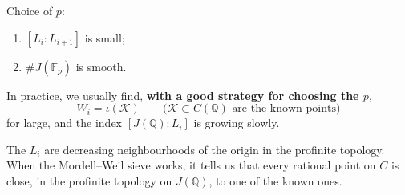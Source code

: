 \documentclass{beamer}
\newcommand{\Q}{{\mathbb Q}}
\newcommand{\F}{{\mathbb F}}
\newcommand{\cK}{\mathcal{K}}
\theoremstyle{definition}
\theoremstyle{remark}
\begin{document}
\begin{frame}
Choice of $p$:
\begin{enumerate}
\item $[L_i : L_{i+1}]$ is small;
\item $\# J(\F_p)$ is smooth.
\end{enumerate}

In practice, we usually find, \textbf{with a good strategy for choosing the $p$},
\[
W_i=\iota(\cK)\qquad \text{($\cK \subset C(\Q)$ are the known points)}
\]
for large, and the index $[J(\Q):L_i]$ is growing slowly.

\bigskip

The $L_i$ are decreasing neighbourhoods of the origin in the profinite topology.
When the Mordell--Weil sieve works, it tells us that every rational point on 
$C$ is close, in the profinite topology on $J(\Q)$, to one of the known ones.
\end{frame}
\end{document}
